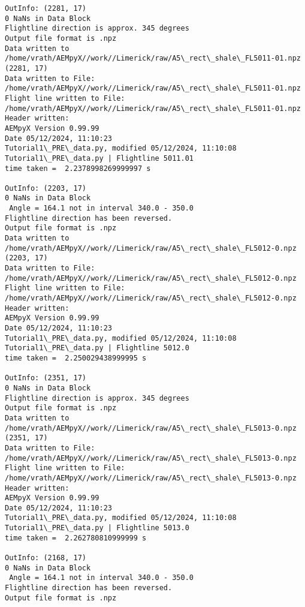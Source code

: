\documentclass[11pt]{article}
\begin{document}
\begin{Verbatim}[commandchars=\\\{\}]
OutInfo: (2281, 17)
0 NaNs in Data Block
Flightline direction is approx. 345 degrees
Output file format is .npz
Data written to
/home/vrath/AEMpyX//work//Limerick/raw/A5\_rect\_shale\_FL5011-01.npz
(2281, 17)
Data written to File:
/home/vrath/AEMpyX//work//Limerick/raw/A5\_rect\_shale\_FL5011-01.npz
Flight line written to File:
/home/vrath/AEMpyX//work//Limerick/raw/A5\_rect\_shale\_FL5011-01.npz
Header written:
AEMpyX Version 0.99.99
Date 05/12/2024, 11:10:23
Tutorial1\_PRE\_data.py, modified 05/12/2024, 11:10:08
Tutorial1\_PRE\_data.py | Flightline 5011.01
time taken =  2.2378998269999997 s

OutInfo: (2203, 17)
0 NaNs in Data Block
 Angle = 164.1 not in interval 340.0 - 350.0
Flightline direction has been reversed.
Output file format is .npz
Data written to
/home/vrath/AEMpyX//work//Limerick/raw/A5\_rect\_shale\_FL5012-0.npz
(2203, 17)
Data written to File:
/home/vrath/AEMpyX//work//Limerick/raw/A5\_rect\_shale\_FL5012-0.npz
Flight line written to File:
/home/vrath/AEMpyX//work//Limerick/raw/A5\_rect\_shale\_FL5012-0.npz
Header written:
AEMpyX Version 0.99.99
Date 05/12/2024, 11:10:23
Tutorial1\_PRE\_data.py, modified 05/12/2024, 11:10:08
Tutorial1\_PRE\_data.py | Flightline 5012.0
time taken =  2.250029438999995 s

OutInfo: (2351, 17)
0 NaNs in Data Block
Flightline direction is approx. 345 degrees
Output file format is .npz
Data written to
/home/vrath/AEMpyX//work//Limerick/raw/A5\_rect\_shale\_FL5013-0.npz
(2351, 17)
Data written to File:
/home/vrath/AEMpyX//work//Limerick/raw/A5\_rect\_shale\_FL5013-0.npz
Flight line written to File:
/home/vrath/AEMpyX//work//Limerick/raw/A5\_rect\_shale\_FL5013-0.npz
Header written:
AEMpyX Version 0.99.99
Date 05/12/2024, 11:10:23
Tutorial1\_PRE\_data.py, modified 05/12/2024, 11:10:08
Tutorial1\_PRE\_data.py | Flightline 5013.0
time taken =  2.262780810999999 s

OutInfo: (2168, 17)
0 NaNs in Data Block
 Angle = 164.1 not in interval 340.0 - 350.0
Flightline direction has been reversed.
Output file format is .npz
    \end{Verbatim}
\end{document}
